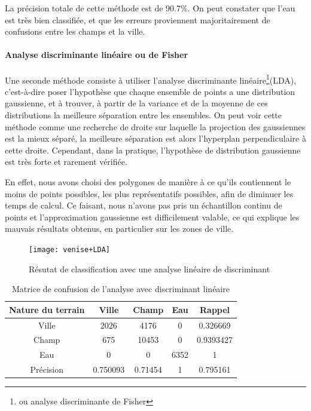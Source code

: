 \documentclass[a4paper,10pt]{report}
\begin{document}
La précision totale de cette méthode est de 90.7\%. On peut constater que l'eau est très bien classifiée, et que les erreurs proviennent majoritairement de confusions entre les champs et la ville.

\paragraph{Analyse discriminante linéaire ou de Fisher}
  Une seconde méthode consiste à utiliser l'analyse discriminante linéaire\footnote{ou analyse discriminante de Fisher}(LDA), c'est-à-dire poser l'hypothèse que chaque ensemble de points a une distribution gaussienne, et à trouver, à partir de la variance et de la moyenne de ces distributions la meilleure séparation entre les ensembles. On peut voir cette méthode comme une recherche de droite sur laquelle la projection des gaussiennes est la mieux séparé, la meilleure séparation est alors l'hyperplan perpendiculaire à cette droite. Cependant, dans la pratique, l'hypothèse de distribution gaussienne est très forte et rarement vérifiée.
  
  En effet, nous avons choisi des polygones de manière à ce qu'ils contiennent le moins de points possibles, les plus représentatifs possibles, afin de diminuer les temps de calcul. Ce faisant, nous n'avons pas pris un échantillon continu de points et l'approximation gaussienne est difficilement valable, ce qui explique les mauvais résultats obtenus, en particulier sur les zones de ville.
\begin{figure}
  \centering
    \texttt{[image: venise+LDA]}
  \caption{Résutat de classification avec une analyse linéaire de discriminant}
  \label{fig:veniseLDA}
\end{figure}

\begin{table}
\begin{center}
 \begin{tabular}{|c|c|c|c|c|}
  \hline
  Nature du terrain & Ville & Champ & Eau & Rappel \\
  \hline
Ville & 2026  &   4176  &      0 & 0.326669 \\
Champ & 675  &  10453   &     0 & 0.9393427 \\
Eau &  0    &    0  &   6352   &     1 \\
Précision & 0.750093 & 0.71454  &      1 & 0.795161\\
  \hline
\end{tabular}
\end{center}
\caption{Matrice de confusion de l'analyse avec discriminant linéaire }
\label{table:veniseLDA}
\end{table}
    
\end{document}
